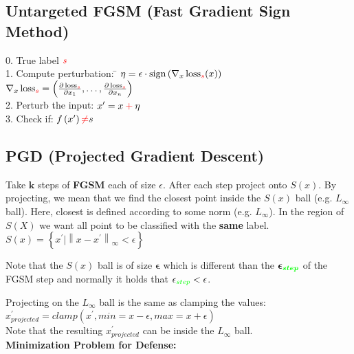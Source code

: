 \documentclass[11pt]{extarticle}
\begin{document}
\begin{multicols*}{3}
			\subsection*{{\color{red}Un}targeted FGSM (Fast Gradient Sign Method)}
			\begin{tabbing}
			     0. True label ${\color{red} s}$ \\
				 1. Compute perturbation: \hspace{2mm} \= $\eta = \epsilon \cdot \operatorname { sign } \left( \nabla _ { x } \operatorname { loss } _ { \mathbin{\textcolor{red}s}} ( x ) \right)$ \\
				
				\> $\nabla _ { x } \operatorname { loss } _ { \mathbin{\textcolor{red}s}} = \left( \frac { \partial \operatorname { loss } _ { {\color{red}s}} } { \partial x _ { 1 } } , \ldots , \frac { \partial \operatorname { loss } _ { {\color{red}s}} } { \partial x _ { n } } \right)$ \\

				
				2. Perturb the input: \> $x ^ { \prime } = x \mathbin{\textcolor{red}+} \eta$ \\
				3. Check if: \> $f \left( x ^ { \prime } \right)  \mathbin{\textcolor{red}\neq s}$
			\end{tabbing}
			
			\subsection*{PGD (Projected Gradient Descent)}
			Take $\boldsymbol{k}$ steps of \textbf{FGSM} each of size $\epsilon$. After each step project onto $S ( x )$. By projecting, we mean that we find the closest point inside the $ S ( x )$  ball (e.g. $L_{\infty}$ ball). Here, closest is defined according to some norm (e.g. $L_{\infty}$). In the region of $S(X)$ we want all point to be classified with the \textbf{same} label.
			\\
			$S ( x ) = \left\{ x ^ { \prime } | \left\| x - x ^ { \prime } \right\| _ { \infty } < \epsilon \right\}$

			Note that the $S ( x ) $ ball is of size $\boldsymbol \epsilon $ which is different than the $ \boldsymbol{ \epsilon _ {\color{green} step }  }$ of the {\color{green}FGSM step} and normally it holds that $\epsilon _ {\color{green} step } < \epsilon $.
			
			Projecting on the $L_{\infty}$ ball is the same as clamping the values: $x ^ { \prime }_{projected} = clamp(x ^ { \prime }, min=x-\epsilon, max= x+\epsilon)$ \\
			Note that the resulting $x ^ { \prime }_{projected}$ can be inside the $L_{\infty}$ ball.
			\\
		\textbf{Minimization Problem for Defense:}
			

\end{multicols*}
\end{document}
